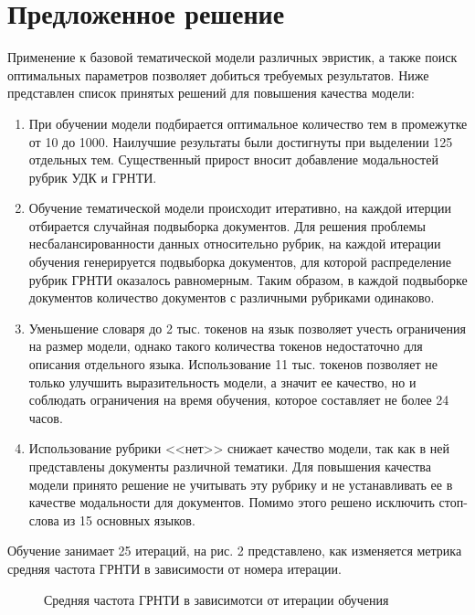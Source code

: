 \documentclass[12pt, twoside]{article}
\begin{document}
\section{Предложенное решение}

Применение к базовой тематической модели различных эвристик, а также поиск оптимальных параметров позволяет добиться требуемых результатов. Ниже представлен список принятых решений для повышения качества модели:

\begin{enumerate}

\item При обучении модели подбирается оптимальное количество тем в промежутке от 10 до 1000. Наилучшие результаты были достигнуты при выделении 125 отдельных тем. Существенный прирост вносит добавление модальностей рубрик УДК и ГРНТИ. 

\item Обучение тематической модели происходит итеративно, на каждой итерции отбирается случайная подвыборка документов. Для решения проблемы несбалансированности данных относительно рубрик, на каждой итерации обучения генерируется подвыборка документов, для которой распределение рубрик ГРНТИ оказалось равномерным. Таким образом, в каждой подвыборке документов количество документов с различными рубриками одинаково.

\item Уменьшение словаря до 2 тыс. токенов на язык позволяет учесть ограничения на размер модели, однако такого количества токенов недостаточно для описания отдельного языка. Использование 11 тыс. токенов позволяет не только улучшить выразительность модели, а значит ее качество, но и соблюдать ограничения на время обучения, которое составляет не более 24 часов.

\item Использование рубрики <<нет>> снижает качество модели, так как в ней представлены документы различной тематики. Для повышения качества модели принято решение не учитывать эту рубрику и не устанавливать ее в качестве модальности для документов. Помимо этого решено исключить стоп-слова из 15 основных языков.

\end{enumerate}

Обучение занимает 25 итераций, на рис. 2 представлено, как изменяется метрика средняя частота ГРНТИ в зависимости от номера итерации.

\begin{figure}[h]
\centering
 \caption{Средняя частота ГРНТИ в зависимотси от итерации обучения}
  \label{fig:1}
\end{figure}
\end{document}
